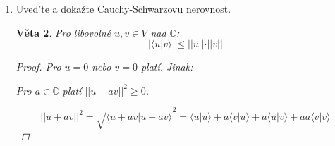 \documentclass[10pt,a4paper]{article}
\theoremstyle{plain}
\newtheorem{veta}{Věta}
\begin{document}
\begin{enumerate}
\begin{veta}
\begin{proof}
Označme $A_n = A$

V tělese $\mathbb{C}$ má matice $A_n$ vlastní číslo $\lambda$ s vlastním vektorem $x$.

Zvětšíme $x$ faktorem $\frac{1}{\sqrt{x^Hx}}$, abychom dostali $x^Hx=1$.

Doplníme $x$ na unitární matici $P_n$. (To je možné dle "faktu" z přednášky).

$P^H_nA_nP_n$ je hermitovská: $(P^H_nA_nP_n)^H = P^H_nA_n^H(P_n^H)^H = P^H_nA_nP_n$.

Protože $A_nx = \lambda x$, matice $A_nP_n$ má $\lambda x$ jako první sloupec.

Protože $P_n$ je unitární, první sloupec $P^H_nA_nP_n$ je $\lambda P^Hx = \lambda(1, 0, ..., 0)^T = (\lambda, 0, ... , 0)^T$. (součin unitární matice a hermitovské transpozice je jednotková matice)

Protože je daná matice hermitovská a prvek $\lambda$ leží na diagonále, $\lambda \in \mathbb{R}$, zbytek prvního řádku je taktéž nulový.
 
 Tedy $P^H_nA_nP_n =  \begin{array}{|c|c|} \hline  \lambda & 0^T  \\ \hline  0 & A_{n-1} \\ \hline \end{array}$, kde $A_{n-1}$ je hermitovská.
 
Podle indukčního předpokladu existuje $R_{n-1}$, t.ž. $R^{-1}_{n-1}A_{n-1}R_{n-1} = D_{n-1}$.

Položme $R_n = P_n \cdot\begin{array}{|c|c|} \hline  \lambda & 0^T  \\ \hline  0 & R_{n-1} \\ \hline \end{array}$.

Pak $R^{-1}_nA_nR_n = D_n$
 
 
\end{proof}
\end{veta}

\item Uved'te a dokažte Cauchy-Schwarzovu nerovnost.
\begin{veta}
Pro libovolné $u, v \in V$ nad $\mathbb{C}$:
\[ |\langle u | v \rangle | \leq ||u|| \cdot ||v|| \]
\begin{proof} Pro $u = 0$ nebo $v = 0$ platí. Jinak:

Pro $a \in \mathbb{C}$ platí $||u + av||^2 \geq 0$.

\[||u + av||^2 = \sqrt{\langle u+av|u+av \rangle}^2 
= \langle u|u \rangle  + a\langle v|u \rangle + \overline{a}\langle u|v \rangle  + a \overline{a}\langle v|v \rangle \]


\end{proof}
\end{veta}
\end{enumerate}
\end{document}

